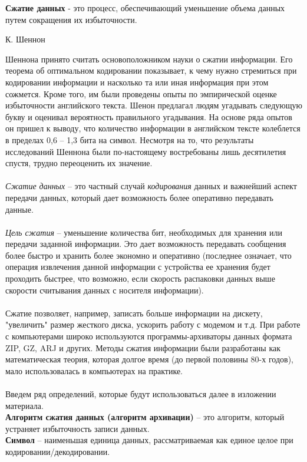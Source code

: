 \textbf{Сжатие данных} - это процесс, обеспечивающий уменьшение объема данных путем сокращения их избыточности.
\begin{flushright}
  К. Шеннон
\end{flushright}
 Шеннона принято считать основоположником науки о сжатии информации. Его теорема об оптимальном кодировании показывает, к чему нужно стремиться при кодировании информации и насколько та или иная информация при этом сожмется. Кроме того, им были проведены опыты по эмпирической оценке избыточности английского текста. Шенон предлагал людям угадывать следующую букву и оценивал вероятность правильного угадывания. На основе ряда опытов он пришел к выводу, что количество информации в английском тексте колеблется в пределах 0,6 – 1,3 бита на символ. Несмотря на то, что результаты исследований Шеннона были по-настоящему востребованы лишь десятилетия спустя, трудно переоценить их значение.\\
\\\emph{Сжатие данных} -- это частный случай \emph{кодирования} данных и важнейший аспект передачи данных, который дает возможность более оперативно передавать данные. 
\\\\\emph{Цель сжатия} -- уменьшение количества бит, необходимых для хранения или передачи заданной информации. Это дает возможность передавать сообщения более быстро и хранить более экономно и оперативно (последнее означает, что операция извлечения данной информации с устройства ее хранения будет проходить быстрее, что возможно, если скорость распаковки данных выше скорости считывания данных с носителя информации).\\
\\Сжатие позволяет, например, записать больше информации на дискету, "увеличить" размер жесткого диска, ускорить работу с модемом и т.д. При работе с компьютерами широко используются программы-архиваторы данных формата ZIP, GZ, ARJ и других. Методы сжатия информации были разработаны как математическая теория, которая долгое время (до первой половины 80-х годов), мало использовалась в компьютерах на практике.\\
\\Введем ряд определений, которые будут использоваться далее в изложении материала.
\\\textbf{Алгоритм сжатия данных (алгоритм архивации)} -- это алгоритм, который устраняет избыточность записи данных.
\\\textbf{Символ} -- наименьшая единица данных, рассматриваемая как единое целое при кодировании/декодировании.
